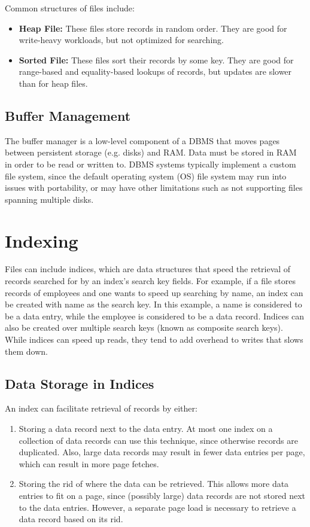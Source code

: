 \documentclass[12pt,titlepage]{article}
\let\stdsection\section
\renewcommand\section{\clearpage\stdsection}
\begin{document}
      Common structures of files include:
      \begin{itemize}
        \item \textbf{Heap File:} These files store records in random order. They are good for write-heavy workloads,
          but not optimized for searching.
        \item \textbf{Sorted File:} These files sort their records by some key. They are good for range-based and
          equality-based lookups of records, but updates are slower than for heap files.
      \end{itemize}

    \subsection{Buffer Management}
      The buffer manager is a low-level component of a DBMS that moves pages between persistent storage (e.g. disks)
      and RAM. Data must be stored in RAM in order to be read or written to. DBMS systems typically implement a custom
      file system, since the default operating system (OS) file system may run into issues with portability, or may
      have other limitations such as not supporting files spanning multiple disks.

  \section{Indexing}
      Files can include indices, which are data structures that speed the retrieval of records searched for by an index's
      search key fields. For example, if a file stores records of employees and one wants to speed up searching by name,
      an index can be created with name as the search key. In this example, a name is considered to be a data entry, while
      the employee is considered to be a data record. Indices can also be created over multiple search keys (known as composite
      search keys). While indices can speed up reads, they tend to add overhead to writes that slows them down.

    \subsection{Data Storage in Indices}
      An index can facilitate retrieval of records by either:
      \begin{enumerate}
        \item Storing a data record next to the data entry. At most one index on a collection of data records can use
          this technique, since otherwise records are duplicated. Also, large data records may result in fewer data entries
          per page, which can result in more page fetches.
        \item Storing the rid of where the data can be retrieved. This allows more data entries to fit on a page, since (possibly
          large) data records are not stored next to the data entries. However, a separate page load is necessary to retrieve
          a data record based on its rid.
      \end{enumerate}
\end{document}
